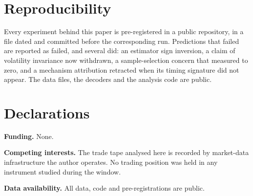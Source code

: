 \documentclass[11pt,a4paper]{article}
\begin{document}
\section{Reproducibility}

Every experiment behind this paper is pre-registered in a public repository, in a file dated and
committed before the corresponding run. Predictions that failed are reported as failed, and
several did: an estimator sign inversion, a claim of volatility invariance now withdrawn, a
sample-selection concern that measured to zero, and a mechanism attribution retracted when its
timing signature did not appear. The data files, the decoders and the analysis code are public.

\section*{Declarations}

\textbf{Funding.} None.

\textbf{Competing interests.} The trade tape analysed here is recorded by market-data
infrastructure the author operates. No trading position was held in any instrument studied during
the window.

\textbf{Data availability.} All data, code and pre-registrations are public.
\end{document}

